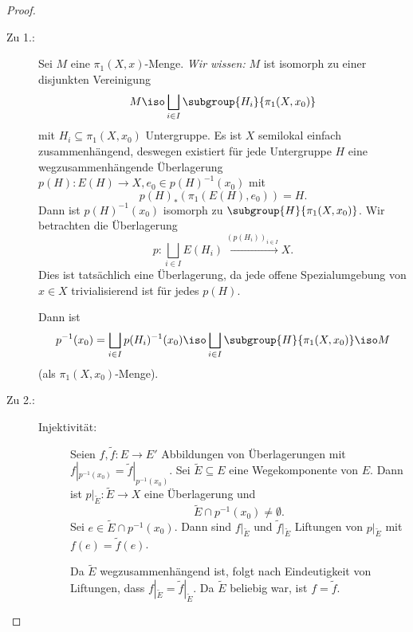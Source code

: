 \documentclass[language=ngerman]{TemplateLecture} %
\begin{document}
\begin{proof}
    \begin{description}
        \item[Zu 1.:] Sei $M$ eine $\pi_1(X,x)$-Menge. \emph{Wir wissen:} $M$ ist isomorph zu einer disjunkten Vereinigung 
        \begin{equation*}
            M \iso \bigsqcup_{i \in I} \subgroup{H_i}{\pi_1(X,x_0)}
        \end{equation*}
        mit $H_i \subseteq \pi_1(X,x_0)$ Untergruppe. Es ist $X$ semilokal einfach zusammenhängend, deswegen existiert für jede Untergruppe $H$ eine wegzusammenhängende Überlagerung $p(H) : E(H) \to X, e_0 \in p(H)^{-1}(x_0)$ mit 
        \begin{equation*}
            p(H)_*(\pi_1(E(H), e_0)) = H.
        \end{equation*}
        Dann ist $p(H)^{-1}(x_0)$ isomorph zu $\subgroup{H}{\pi_1(X,x_0)}$. Wir betrachten die Überlagerung 
        \begin{equation*}
            p: \bigsqcup_{i \in I} E(H_i) \overset{(p(H_i))_{i \in I}}{\longrightarrow} X.
        \end{equation*}
        Dies ist tatsächlich eine Überlagerung, da jede offene Spezialumgebung von $x \in X$ trivialisierend ist für jedes $p(H)$.

        Dann ist 
        \begin{equation*}
            p^{-1}(x_0) = \bigsqcup_{i \in I} p(H_i)^{-1}(x_0) \iso \bigsqcup_{i \in I} \subgroup{H}{\pi_1(X,x_0)} \iso M
        \end{equation*}
        (als $\pi_1(X,x_0)$-Menge).
        
        \item[Zu 2.:] \begin{description}
            \item[Injektivität:] Seien $f, \tilde{f}: E \to E'$ Abbildungen von Überlagerungen mit $f|_{p^{-1}(x_0)} = \tilde{f}|_{p^{-1}(x_0)}$. Sei $\tilde{E} \subseteq E$ eine Wegekomponente von $E$. Dann ist $p|_{\tilde{E}} : \tilde{E} \to X$ eine Überlagerung und 
            \begin{equation*}
                \tilde{E} \cap p^{-1}(x_0) \neq \emptyset.
            \end{equation*}
            Sei $e \in \tilde{E} \cap p^{-1}(x_0)$. Dann sind $f|_{\tilde{E}}$ und $\tilde{f}|_{\tilde{E}}$ Liftungen von $p|_{\tilde{E}}$ mit $f(e) = \tilde{f}(e)$.

            Da $\tilde{E}$ wegzusammenhängend ist, folgt nach Eindeutigkeit von Liftungen, dass $f|_{\tilde{E}} = \tilde{f}|_{\tilde{E}}$. Da $\tilde{E}$ beliebig war, ist $f = \tilde{f}$.


\end{description}
\end{description}
\end{proof}
\end{document}
